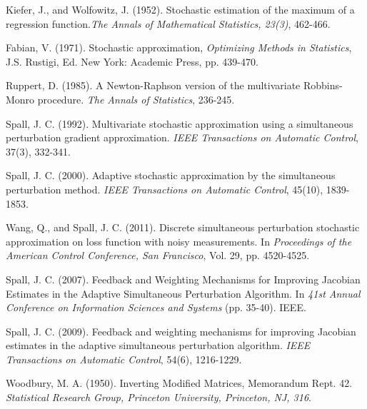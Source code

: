 \documentclass[conference,10.3cpt]{IEEEtran}
\newcommand{\remove}[1]{}
\begin{document}
\begin{thebibliography}{1}
	
	Kiefer, J., and Wolfowitz, J. (1952). Stochastic estimation of the maximum of a regression function.\textit{The Annals of Mathematical Statistics, 23(3)}, 462-466.
	
	Fabian, V. (1971). Stochastic approximation, \textit{Optimizing Methods in Statistics}, J.S. Rustigi, Ed. New York: Academic Press, pp. 439-470.
	
	Ruppert, D. (1985). A Newton-Raphson version of the multivariate Robbins-Monro procedure. \textit{The Annals of Statistics}, 236-245.

 Spall, J. C. (1992). Multivariate
  stochastic approximation using a simultaneous perturbation gradient
  approximation. \textit{IEEE Transactions on Automatic Control},
  37(3), 332-341.

 Spall, J. C. (2000). Adaptive
  stochastic approximation by the simultaneous perturbation
  method. \textit{IEEE Transactions on Automatic Control}, 45(10),
  1839-1853.


Wang, Q., and Spall, J. C. (2011). Discrete simultaneous perturbation stochastic approximation on loss function with noisy measurements. In \textit{Proceedings of the American Control Conference, San Francisco}, Vol. 29, pp. 4520-4525.

\remove{\bibitem{Wang2011}
	Wang, Q. (2011). Stochastic approximation for discrete optimization of noisy loss measurements. In \textit{2011 45th Annual Conference on Information Sciences and Systems} (pp. 1-4).  IEEE.
	
}

Spall, J. C. (2007). Feedback and Weighting Mechanisms for Improving Jacobian Estimates in the Adaptive Simultaneous Perturbation Algorithm. In \textit{41st Annual Conference on Information Sciences and Systems} (pp. 35-40). IEEE.


 Spall, J. C. (2009). Feedback and
  weighting mechanisms for improving Jacobian estimates in the adaptive
  simultaneous perturbation algorithm. \textit{IEEE Transactions on Automatic Control}, 54(6), 1216-1229.


 Woodbury,
  M. A. (1950). Inverting Modified Matrices, Memorandum
  Rept. 42. \textit{Statistical Research Group, Princeton University,
    Princeton, NJ, 316}.


\end{thebibliography}
\end{document}
